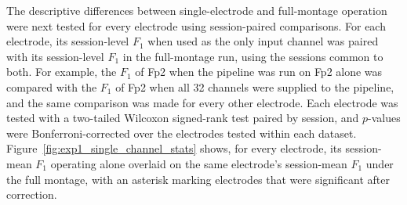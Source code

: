 The descriptive differences between single-electrode and full-montage operation were next tested for every electrode using session-paired comparisons. For each electrode, its session-level $F_1$ when used as the only input channel was paired with its session-level $F_1$ in the full-montage run, using the sessions common to both. For example, the $F_1$ of Fp2 when the pipeline was run on Fp2 alone was compared with the $F_1$ of Fp2 when all 32 channels were supplied to the pipeline, and the same comparison was made for every other electrode.
%
Each electrode was tested with a two-tailed Wilcoxon signed-rank test paired by session, and $p$-values were Bonferroni-corrected over the electrodes tested within each dataset.
Figure~\ref{fig:exp1_single_channel_stats} shows, for every electrode, its session-mean $F_1$ operating alone overlaid on the same electrode's session-mean $F_1$ under the full montage, with an asterisk marking electrodes that were significant after correction.

